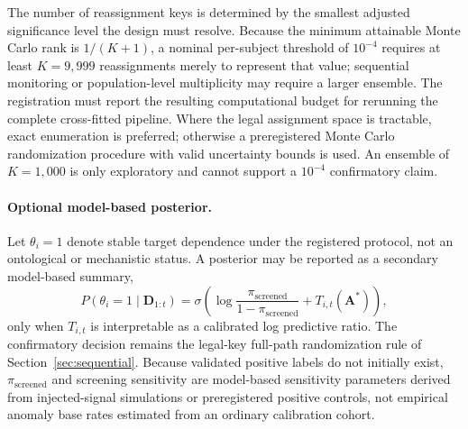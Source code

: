 \documentclass[11pt,letterpaper]{article}
\begin{document}
The number of reassignment keys is determined by the smallest adjusted significance level the design must resolve. Because the minimum attainable Monte Carlo rank is $1/(K+1)$, a nominal per-subject threshold of $10^{-4}$ requires at least $K=9{,}999$ reassignments merely to represent that value; sequential monitoring or population-level multiplicity may require a larger ensemble. The registration must report the resulting computational budget for rerunning the complete cross-fitted pipeline. Where the legal assignment space is tractable, exact enumeration is preferred; otherwise a preregistered Monte Carlo randomization procedure with valid uncertainty bounds is used. An ensemble of $K=1{,}000$ is only exploratory and cannot support a $10^{-4}$ confirmatory claim.

\paragraph{Optional model-based posterior.}
Let $\theta_i=1$ denote stable target dependence under the registered protocol, not an ontological or mechanistic status. A posterior may be reported as a secondary model-based summary,
\begin{equation}
P(\theta_i=1\mid\mathbf{D}_{1:t})
=\sigma\!\left(\log\frac{\pi_{\mathrm{screened}}}{1-\pi_{\mathrm{screened}}}+T_{i,t}(\mathbf{A}^{*})\right),
\label{eq:bayes}
\end{equation}
only when $T_{i,t}$ is interpretable as a calibrated log predictive ratio. The confirmatory decision remains the legal-key full-path randomization rule of Section~\ref{sec:sequential}. Because validated positive labels do not initially exist, $\pi_{\mathrm{screened}}$ and screening sensitivity are model-based sensitivity parameters derived from injected-signal simulations or preregistered positive controls, not empirical anomaly base rates estimated from an ordinary calibration cohort.
\end{document}
